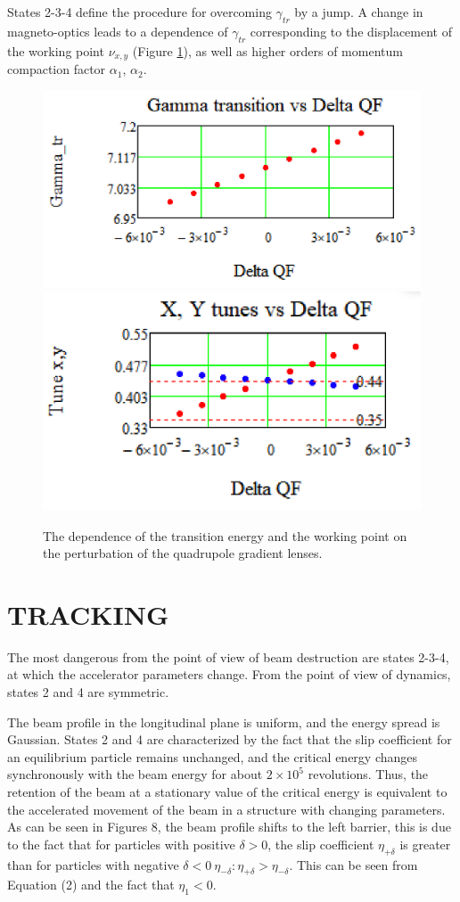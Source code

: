 \documentclass[
aps,%
12pt,%
final,%
notitlepage,%
oneside,%
onecolumn,%
nobibnotes,%
nofootinbib,%
superscriptaddress,%
noshowpacs,%
centertags]%
{revtex4}
\begin{document}
\par States 2-3-4 define the procedure for overcoming $\gamma_{tr}$ by a jump. A change in magneto-optics leads to a dependence of $\gamma_{tr}$ corresponding to the displacement of the working point $\nu_{x,y}$ (Figure \ref{fig:tran}), as well as higher orders of momentum compaction factor $\alpha_1$, $\alpha_2$.

\begin{figure}[!h]
\setcaptionmargin{5mm}
   \includegraphics*[width=.49\columnwidth]{img/fig_02-1}
   \includegraphics*[width=.49\columnwidth]{img/fig_02-2}
\caption{The dependence of the transition energy and the working point on the perturbation of the quadrupole gradient lenses.}
\label{fig:tran}
\end{figure}

\section{TRACKING}

\par The most dangerous from the point of view of beam destruction are states 2-3-4, at which the accelerator parameters change. From the point of view of dynamics, states 2 and 4 are symmetric.

\par The beam profile in the longitudinal plane is uniform, and the energy spread is Gaussian. States 2 and 4 are characterized by the fact that the slip coefficient for an equilibrium particle remains unchanged, and the critical energy changes synchronously with the beam energy for about $2\times{10}^5$ revolutions. Thus, the retention of the beam at a stationary value of the critical energy is equivalent to the accelerated movement of the beam in a structure with changing parameters. As can be seen in Figures 8, the beam profile shifts to the left barrier, this is due to the fact that for particles with positive $\delta>0$, the slip coefficient $\eta_{+\delta}$ is greater than for particles with negative $\delta<0\ \eta_{-\delta}: \eta_{+\delta}>\eta_{-\delta}$. This can be seen from Equation (2) and the fact that $\eta_1<0$.
\end{document}
